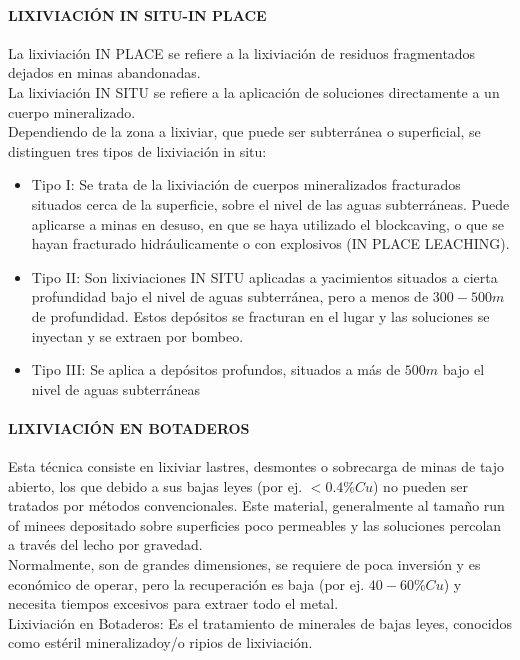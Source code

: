 \paragraph{LIXIVIACI\'ON IN SITU-IN PLACE}
La lixiviaci\'on IN PLACE se refiere a la lixiviaci\'on de residuos fragmentados dejados en minas abandonadas.\\
La lixiviaci\'on IN SITU se refiere a la aplicaci\'on de soluciones directamente a un cuerpo mineralizado.\\
Dependiendo de la zona a lixiviar, que puede ser subterr\'anea o superficial, se distinguen tres tipos de lixiviaci\'on in situ:
\begin{itemize}
 \item Tipo I: Se trata de la lixiviaci\'on de cuerpos mineralizados fracturados situados cerca de la superficie, sobre el nivel de las aguas subterr\'aneas. Puede aplicarse a minas en desuso, en que se haya utilizado el \textacutedbl blockcaving\textgravedbl, o que se hayan fracturado hidr\'aulicamente o con explosivos (IN PLACE LEACHING).
 \item Tipo II: Son lixiviaciones IN SITU aplicadas a yacimientos situados a cierta profundidad bajo el nivel de aguas subterr\'anea, pero a menos de $300-500m$ de profundidad. Estos dep\'ositos se fracturan en el lugar y las soluciones se inyectan y se extraen por bombeo.
 \item Tipo III: Se aplica a dep\'ositos profundos, situados a m\'as de $500m$ bajo el nivel de aguas subterr\'aneas
\end{itemize}

\paragraph{LIXIVIACI\'ON EN BOTADEROS}
Esta t\'ecnica consiste en lixiviar lastres, desmontes o sobrecarga de minas de tajo abierto, los que debido a sus bajas leyes (por ej. $< 0.4\%Cu$) no pueden ser tratados por m\'etodos convencionales. Este material, generalmente al tama\~no \textacutedbl run of mine\textgravedbl es depositado sobre superficies poco permeables y las soluciones percolan a trav\'es del lecho por gravedad.\\ Normalmente, son de grandes dimensiones, se requiere de poca inversi\'on y es econ\'omico de operar, pero la recuperaci\'on es baja (por ej. $40-60\% Cu$) y necesita tiempos excesivos para extraer todo el metal.\\
Lixiviaci\'on en Botaderos: Es el tratamiento de minerales de bajas leyes, conocidos como \textacutedbl est\'eril mineralizado\textgravedbl y/o ripios de lixiviaci\'on.


